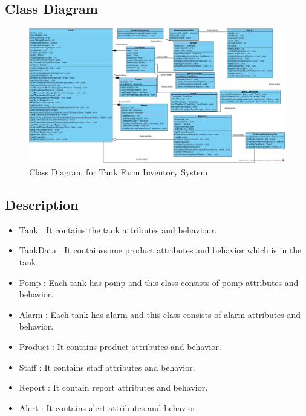 \begin{flushleft}
	\newpage	
	\subsection{Class Diagram}
	\vspace*{1\baselineskip}
	\begin{figure}[htbp]
		\begin{center}
			\includegraphics[width=1.00\linewidth]{./images/ClassDiagram.jpg}
			\caption{Class Diagram for Tank Farm Inventory System.}
			\label{fig:ClassDiagram.jpg}
		\end{center}
	\end{figure}
	
	\subsection{Description}
	\vspace*{1\baselineskip}
	
		\begin{itemize}
			\item Tank : It contains the tank attributes and behaviour.
			\item TankData : It containssome product attributes and behavior which is in the tank.
			\item Pomp : Each tank has pomp and this class consists of pomp attributes and behavior.
			\item Alarm : Each tank has alarm and this class consists of alarm attributes and behavior.
			\item Product : It contains product attributes and behavior.
			\item Staff : It contains staff attributes and behavior.
			\item Report : It contain report attributes and behavior.
			\item Alert : It contains alert attributes and behavior.
		\end{itemize}
		

\end{flushleft}
